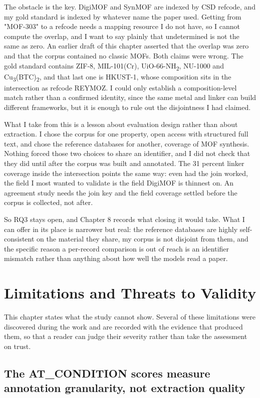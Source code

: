 \documentclass[11pt,a4paper,oneside]{report}
\begin{document}
The obstacle is the key. DigiMOF and SynMOF are indexed by CSD refcode, and my gold standard is indexed by whatever name the paper used. Getting from "MOF-303" to a refcode needs a mapping resource I do not have, so I cannot compute the overlap, and I want to say plainly that undetermined is not the same as zero. An earlier draft of this chapter asserted that the overlap was zero and that the corpus contained no classic MOFs. Both claims were wrong. The gold standard contains ZIF-8, MIL-101(Cr), UiO-66-NH\textsubscript{2}, NU-1000 and Cu\textsubscript{3}(BTC)\textsubscript{2}, and that last one is HKUST-1, whose composition sits in the intersection as refcode REYMOZ. I could only establish a composition-level match rather than a confirmed identity, since the same metal and linker can build different frameworks, but it is enough to rule out the disjointness I had claimed.

What I take from this is a lesson about evaluation design rather than about extraction. I chose the corpus for one property, open access with structured full text, and chose the reference databases for another, coverage of MOF synthesis. Nothing forced those two choices to share an identifier, and I did not check that they did until after the corpus was built and annotated. The 31 percent linker coverage inside the intersection points the same way: even had the join worked, the field I most wanted to validate is the field DigiMOF is thinnest on. An agreement study needs the join key and the field coverage settled before the corpus is collected, not after.

So RQ3 stays open, and Chapter 8 records what closing it would take. What I can offer in its place is narrower but real: the reference databases are highly self-consistent on the material they share, my corpus is not disjoint from them, and the specific reason a per-record comparison is out of reach is an identifier mismatch rather than anything about how well the models read a paper.


\chapter{Limitations and Threats to Validity}


This chapter states what the study cannot show. Several of these limitations were discovered during the work and are recorded with the evidence that produced them, so that a reader can judge their severity rather than take the assessment on trust.

\section{The AT\_CONDITION scores measure annotation granularity, not extraction quality}
\end{document}
